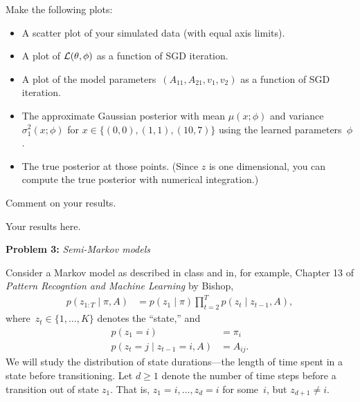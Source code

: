 \documentclass[11pt]{article}
\begin{document}
\begin{enumerate}[label=(\alph*)]
    Make the following plots: 
    \begin{itemize}
        \item A scatter plot of your simulated data (with equal axis limits).
        \item A plot of $\mathcal{L}(\theta, \phi)$ as a function of SGD iteration. 
        \item A plot of the model parameters~$(A_{11}, A_{21}, v_1, v_2)$ as a function of SGD iteration.
        \item The approximate Gaussian posterior with mean $\mu(x; \phi)$ and variance~$\sigma_1^2(x; \phi)$ for $x \in \{(0, 0), (1, 1), (10, 7)\}$ using the learned parameters~$\phi$.
        \item The true posterior at those points. (Since $z$ is one dimensional, you can compute the true posterior with numerical integration.)
    \end{itemize}
    Comment on your results.
    
    \begin{solution}
    Your results here.
    \end{solution}
    
\end{enumerate}

\clearpage

\textbf{Problem 3:} \textit{Semi-Markov models}

Consider a Markov model as described in class and in, for example, Chapter 13 of \textit{Pattern Recogntion and Machine Learning} by Bishop,
\begin{align*}
    p(z_{1:T} \mid \pi, A) &= p(z_1 \mid \pi) \prod_{t=2}^T p(z_t \mid z_{t-1}, A),
\end{align*}
where~$z_t \in \{1, \ldots, K\}$ denotes the ``state,'' and
\begin{align*}
    p(z_1 = i) &= \pi_i \\
    p(z_t = j \mid z_{t-1} = i, A) &= A_{ij}.
\end{align*}
We will study the distribution of state durations---the length of time spent in a state before transitioning.  Let $d \geq 1$ denote the number of time steps before a transition out of state $z_1$.  That is, $z_1 = i, \ldots, z_{d}=i$ for some~$i$, but $z_{d+1} \neq i$.
\end{document}

